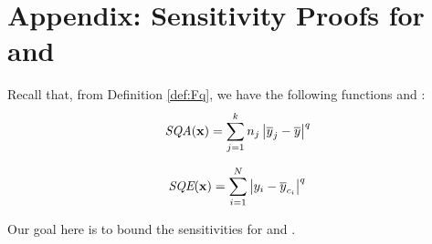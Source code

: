 \section{Appendix: Sensitivity Proofs for \sqa and \sqe}\label{sec:fqsensitivity}

Recall that, from Definition \ref{def:Fq}, we have the following functions \sqa and \sqe:
\begin{equation*}
\textit{SQA}(\mathbf{x}) = \sum_{j=1}^k n_j \left\vert \overline{y}_j - \overline{y} \right\vert^q
\end{equation*}

\begin{equation*}
\textit{SQE}(\mathbf{x}) = \sum_{i=1}^N \left\vert y_i - \overline{y}_{c_i} \right\vert^q
\end{equation*}

\noindent Our goal here is to bound the sensitivities for \sqa and \sqe.

